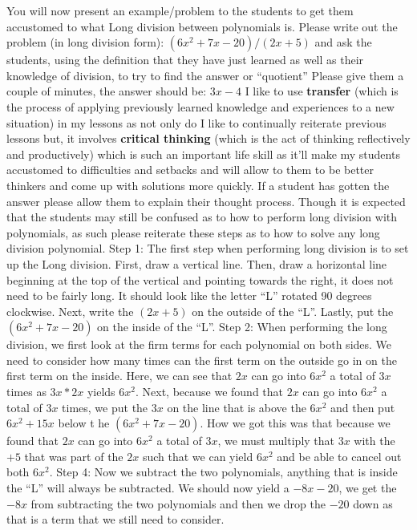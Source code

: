 \begin{outline}
    \1 You will now present an example/problem to the students to get them accustomed to what Long division between polynomials is. Please write out the problem (in long division form): $(6x^2+7x-20)/(2x+5)$ and ask the students, using the definition that they have just learned as well as their knowledge of division, to try to find the answer or “quotient”
        \2 Please give them a couple of minutes, the answer should be: $3x-4$
        \2 I like to use \textbf{transfer} (which is the process of applying previously learned knowledge and experiences to a new situation) in my lessons as not only do I like to continually reiterate previous lessons but, it involves \textbf{critical thinking} (which is the act of thinking reflectively and productively) which is such an important life skill as it'll make my students accustomed to difficulties and setbacks and will allow to them to be better thinkers and come up with solutions more quickly. 
    \1 If a student has gotten the answer please allow them to explain their thought process. Though it is expected that the students may still be confused as to how to perform long division with polynomials, as such please reiterate these steps as to how to solve any long division polynomial.	
        \2 Step 1: The first step when performing long division is to set up the Long division. First, draw a vertical line. Then, draw a horizontal line beginning at the top of the vertical and pointing towards the right, it does not need to be fairly long. It should look like the letter “L” rotated 90 degrees clockwise. Next, write the $(2x+5)$ on the outside of the “L”. Lastly, put the $(6x^2+7x-20)$ on the inside of the “L”. 
        \2 Step 2: When performing the long division, we first look at the firm terms for each polynomial on both sides. We need to consider how many times can the first term on the outside go in on the first term on the inside. Here, we can see that $2x$ can go into $6x^2$ a total of $3x$ times as $3x * 2x$ yields $6x^2$. 
        \2 Next, because we found that $2x$ can go into $6x^2$ a total of $3x$ times, we put the $3x$ on the line that is above the $6x^2$ and then put $6x^2+15x$ below t he $(6x^2+7x-20)$. How we got this was that because we found that $2x$ can go into $6x^2$ a total of $3x$, we must multiply that $3x$ with the $+5$ that was part of the $2x$ such that we can yield $6x^2$  and be able to cancel out both $6x^2$.
        \2 Step 4: Now we subtract the two polynomials, anything that is inside the “L” will always be subtracted. We should now yield a $-8x-20$, we get the $-8x$ from subtracting the two polynomials and then we drop the $-20$ down as that is a term that we still need to consider. 

\end{outline}
